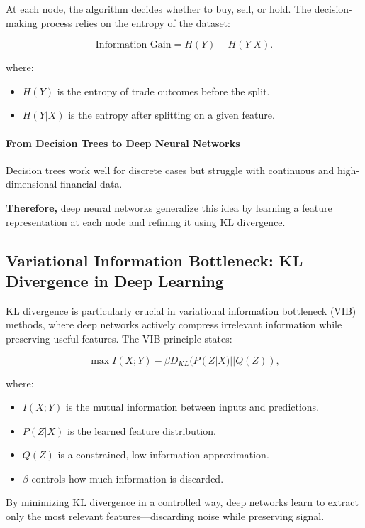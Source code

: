 At each node, the algorithm decides whether to buy, sell, or hold. The decision-making process relies on the entropy of the dataset:

\[
\text{Information Gain} = H(Y) - H(Y | X).
\]

where:
\begin{itemize}
    \item \( H(Y) \) is the entropy of trade outcomes before the split.
    \item \( H(Y | X) \) is the entropy after splitting on a given feature.
\end{itemize}

\paragraph{From Decision Trees to Deep Neural Networks}

Decision trees work well for discrete cases but struggle with continuous and high-dimensional financial data. 

\textbf{Therefore,} deep neural networks generalize this idea by learning a feature representation at each node and refining it using KL divergence.

\subsection{Variational Information Bottleneck: KL Divergence in Deep Learning}

KL divergence is particularly crucial in variational information bottleneck (VIB) methods, where deep networks actively compress irrelevant information while preserving useful features. The VIB principle states:

\[
\max I(X; Y) - \beta D_{KL}(P(Z | X) || Q(Z)),
\]

where:
\begin{itemize}
    \item \( I(X; Y) \) is the mutual information between inputs and predictions.
    \item \( P(Z | X) \) is the learned feature distribution.
    \item \( Q(Z) \) is a constrained, low-information approximation.
    \item \( \beta \) controls how much information is discarded.
\end{itemize}

By minimizing KL divergence in a controlled way, deep networks learn to extract only the most relevant features—discarding noise while preserving signal.

